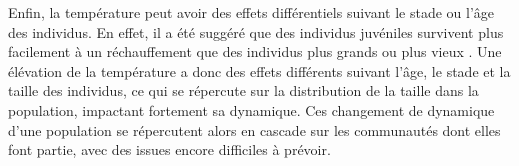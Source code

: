 Enfin, la température peut avoir des effets différentiels suivant le stade ou
l'âge des individus. En effet, il a été suggéré que des individus juvéniles
survivent plus facilement à un réchauffement que des individus plus grands ou
plus vieux \autocites{peck2009a}. Une élévation de la température a donc des
effets différents suivant l'âge, le stade et la taille des individus, ce qui se
répercute sur la distribution de la taille dans la population, impactant
fortement sa dynamique. Ces changement de dynamique d'une population se
répercutent alors en cascade sur les communautés dont elles font partie, avec
des issues encore difficiles à prévoir. 
